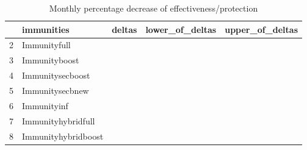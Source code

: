 \begin{table}[ht]
\centering
\begin{tabular}{rllll}
  \hline
 & immunities & deltas & lower\_of\_deltas & upper\_of\_deltas \\ 
  \hline
2 & Immunityfull &  &  &  \\ 
  3 & Immunityboost &  &  &  \\ 
  4 & Immunitysecboost &  &  &  \\ 
  5 & Immunitysecbnew &  &  &  \\ 
  6 & Immunityinf &  &  &  \\ 
  7 & Immunityhybridfull &  &  &  \\ 
  8 & Immunityhybridboost &  &  &  \\ 
   \hline
\end{tabular}
\caption{Monthly percentage decrease of effectiveness/protection} 
\end{table}
